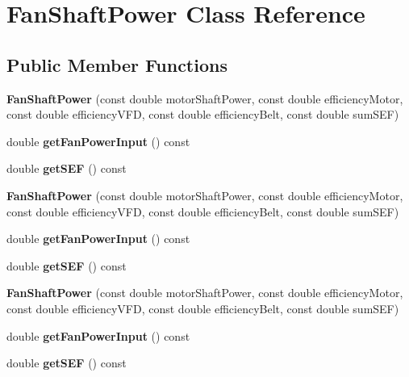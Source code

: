 \hypertarget{class_fan_shaft_power}{}\section{Fan\+Shaft\+Power Class Reference}
\label{class_fan_shaft_power}
\subsection*{Public Member Functions}
\begin{DoxyCompactItemize}
\item 
\mbox{\label{class_fan_shaft_power_afe665bc2baf1a876d265ebc9129f70e2}} 
{\bfseries Fan\+Shaft\+Power} (const double motor\+Shaft\+Power, const double efficiency\+Motor, const double efficiency\+V\+FD, const double efficiency\+Belt, const double sum\+S\+EF)
\item 
\mbox{\label{class_fan_shaft_power_a6008dad9482c28d652c6075185d050e9}} 
double {\bfseries get\+Fan\+Power\+Input} () const
\item 
\mbox{\label{class_fan_shaft_power_a7a36d22c2301d3c634fc89e103daa148}} 
double {\bfseries get\+S\+EF} () const
\item 
\mbox{\label{class_fan_shaft_power_afe665bc2baf1a876d265ebc9129f70e2}} 
{\bfseries Fan\+Shaft\+Power} (const double motor\+Shaft\+Power, const double efficiency\+Motor, const double efficiency\+V\+FD, const double efficiency\+Belt, const double sum\+S\+EF)
\item 
\mbox{\label{class_fan_shaft_power_a6008dad9482c28d652c6075185d050e9}} 
double {\bfseries get\+Fan\+Power\+Input} () const
\item 
\mbox{\label{class_fan_shaft_power_a7a36d22c2301d3c634fc89e103daa148}} 
double {\bfseries get\+S\+EF} () const
\item 
\mbox{\label{class_fan_shaft_power_afe665bc2baf1a876d265ebc9129f70e2}} 
{\bfseries Fan\+Shaft\+Power} (const double motor\+Shaft\+Power, const double efficiency\+Motor, const double efficiency\+V\+FD, const double efficiency\+Belt, const double sum\+S\+EF)
\item 
\mbox{\label{class_fan_shaft_power_a6008dad9482c28d652c6075185d050e9}} 
double {\bfseries get\+Fan\+Power\+Input} () const
\item 
\mbox{\label{class_fan_shaft_power_a7a36d22c2301d3c634fc89e103daa148}} 
double {\bfseries get\+S\+EF} () const
\end{DoxyCompactItemize}
